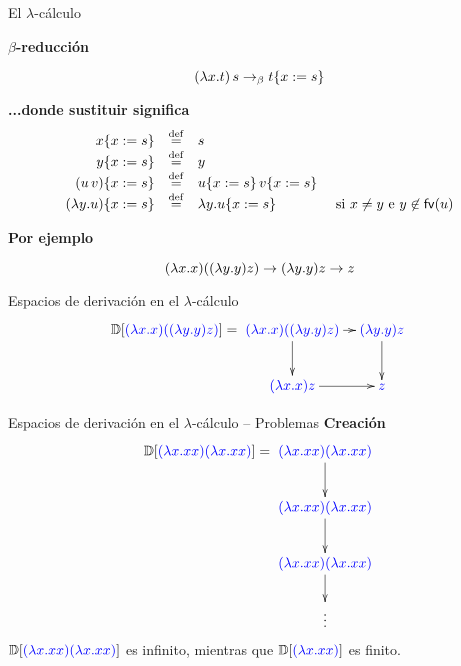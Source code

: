 \documentclass{beamer}
\newcommand{\cLam}[1]{{\color{darkBlue} #1}}
\begin{document}
\begin{frame}{El $\lambda$-cálculo}

\textbf{$\beta$-reducción}

\[
  (\lambda x. t)\, s \to_\beta t\{x := s\}
\]
\vskip 0.5cm


\textbf{...donde sustituir significa}
\[
\begin{array}{rclc}
  x\{x := s\} & \overset{\mathrm{def}}{=} & s & \\
  y\{x := s\} & \overset{\mathrm{def}}{=} & y & \\
  (u\, v)\{x := s\} & \overset{\mathrm{def}}{=} & u\{x := s\}\, v\{x := s\} & \\
  (\lambda y. u)\{x := s\} & \overset{\mathrm{def}}{=} & \lambda y. u\{x := s\} & \text{ si } x\neq y \text{ e } y \not\in \mathsf{fv}({u}) \\
\end{array}
\]

\textbf{Por ejemplo}

\[(\lambda x. x) ((\lambda y. y) z) \to (\lambda y. y) z \to z\]


\end{frame}

\begin{frame}{Espacios de derivación en el $\lambda$-cálculo}
\[\ulbDeriv{\cLam{(\lam{x}{x}) ((\lam{y}{y}) z)}} =
\xymatrix@C=0.3cm{
\cLam{(\lam{x}{x}) ((\lam{y}{y}) z)} \ar[d] \ar[r] & \cLam{(\lam{y}{y}) z} \ar[d] \\
\cLam{(\lam{x}{x}) z}  \ar[r] & \cLam{z}
}
\]
\end{frame}

\begin{frame}{Espacios de derivación en el $\lambda$-cálculo -- Problemas}
\textbf{Creación}
\[\ulbDeriv{\cLam{(\lam{x}{x x}) (\lam{x}{x x})}} =
\xymatrix@C=0.3cm{
\cLam{(\lam{x}{x x}) (\lam{x}{x x})} \ar[d] \\
\cLam{(\lam{x}{x x}) (\lam{x}{x x})} \ar[d] \\
\cLam{(\lam{x}{x x}) (\lam{x}{x x})} \ar[d] \\
\vdots  \\
}
\]
$\ulbDeriv{\cLam{(\lam{x}{x x}) (\lam{x}{x x})}}$ es infinito, mientras que
$\ulbDeriv{\cLam{(\lam{x}{x x})}}$ es finito.
\end{frame}
\end{document}
